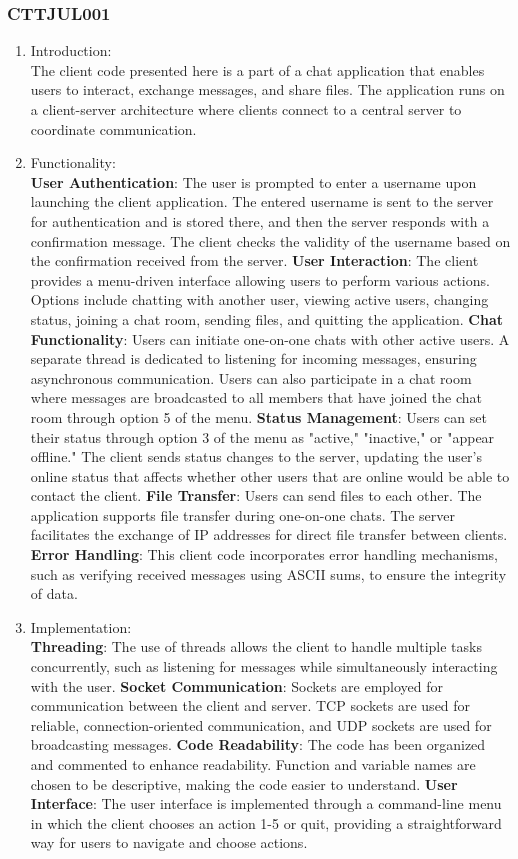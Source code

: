 \documentclass{article}
\begin{document}
\subsubsection{CTTJUL001}
\begin{enumerate}
    \item Introduction: \\
    The client code presented here is a part of a chat application that enables users to interact, exchange messages, and share files. The application runs on a client-server architecture where clients connect to a central server to coordinate communication. 
    \item Functionality: \\
    \textbf{User Authentication}: The user is prompted to enter a username upon launching the client application. The entered username is sent to the server for authentication and is stored there, and then the server responds with a confirmation message. The client checks the validity of the username based on the confirmation received from the server.
\textbf{User Interaction}: The client provides a menu-driven interface allowing users to perform  various actions. Options include chatting with another user, viewing active users, changing status, joining a chat room, sending files, and quitting the application.
\textbf{Chat Functionality}: Users can initiate one-on-one chats with other active users. A separate thread is dedicated to listening for incoming messages, ensuring asynchronous communication. Users can also participate in a chat room where messages are broadcasted to all members that have joined the chat room through option 5 of the menu.
\textbf{Status Management}: Users can set their status through option 3 of the menu as "active," "inactive," or "appear offline." The client sends status changes to the server, updating the user's online status that affects whether other users that are online would be able to contact the client.
\textbf{File Transfer}: Users can send files to each other. The application supports file transfer during one-on-one chats. The server facilitates the exchange of IP addresses for direct file transfer between clients.
\textbf{Error Handling}: This client code incorporates error handling mechanisms, such as verifying received messages using ASCII sums, to ensure the integrity of data.

\item Implementation: \\
\textbf{Threading}: The use of threads allows the client to handle multiple tasks concurrently, such as listening for messages while simultaneously interacting with the user.
\textbf{Socket Communication}: Sockets are employed for communication between the client and server. TCP sockets are used for reliable, connection-oriented communication, and UDP sockets are used for broadcasting messages.
\textbf{Code Readability}: The code has been organized and commented to enhance readability. Function and variable names are chosen to be descriptive, making the code easier to understand.
\textbf{User Interface}: The user interface is implemented through a command-line menu in which the client chooses an action 1-5 or quit, providing a straightforward way for users to navigate and choose actions.


\end{enumerate}
\end{document}
